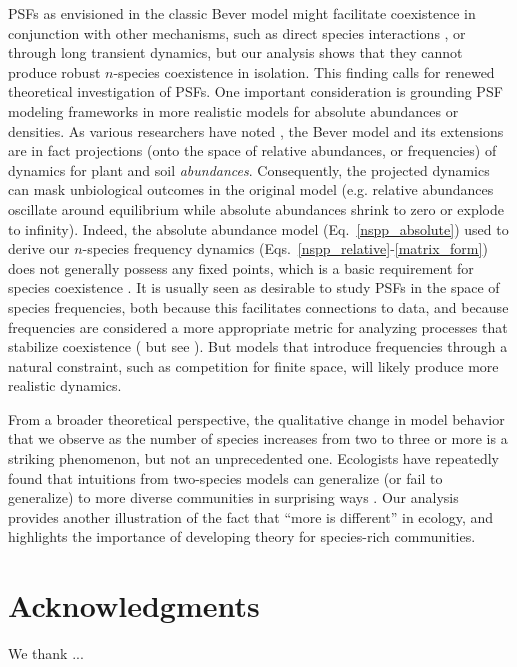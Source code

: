 \documentclass[11pt]{article}
\begin{document}
PSFs as envisioned in the classic Bever model might facilitate coexistence in conjunction with other mechanisms, such as direct species interactions \citep{bever2003soil}, or through long transient dynamics, but our analysis shows that they cannot produce robust $n$-species coexistence in isolation. This finding calls for renewed theoretical investigation of PSFs. One important consideration is grounding PSF modeling frameworks in more realistic models for absolute abundances or densities. As various researchers have noted \citep{kulmatiski2011testing,revilla2013plant,eppinga2018frequency,ke2020effects}, the Bever model and its extensions are in fact projections (onto the space of relative abundances, or frequencies) of dynamics for plant and soil \emph{abundances}. Consequently, the projected dynamics can mask unbiological outcomes in the original model (e.g. relative abundances oscillate around equilibrium while absolute abundances shrink to zero or explode to infinity). Indeed, the absolute abundance model (Eq.~\ref{nspp_absolute}) used to derive our $n$-species frequency dynamics (Eqs.~\ref{nspp_relative}-\ref{matrix_form}) does not generally possess any fixed points, which is a basic requirement for species coexistence \citep{hutson1990existence,hutson1992permanence}. It is usually seen as desirable to study PSFs in the space of species frequencies, both because this facilitates connections to data, and because frequencies are considered a more appropriate metric for analyzing processes that stabilize coexistence (\citep{adler2007niche,eppinga2018frequency} but see \citep{kandlikar2019winning,ke2020effects}). But models that introduce frequencies through a natural constraint, such as competition for finite space, will likely produce more realistic dynamics.

From a broader theoretical perspective, the qualitative change in model behavior that we observe as the number of species increases from two to three or more is a striking phenomenon, but not an unprecedented one. Ecologists have repeatedly found that intuitions from two-species models can generalize (or fail to generalize) to more diverse communities in surprising ways \citep{strobeck1973n,smale1976differential,barabas2016effect}. Our analysis provides another illustration of the fact that ``more is different'' \citep{anderson1972more} in ecology, and highlights the importance of developing theory for species-rich communities.

\section*{Acknowledgments}
We thank ...



\end{document}
